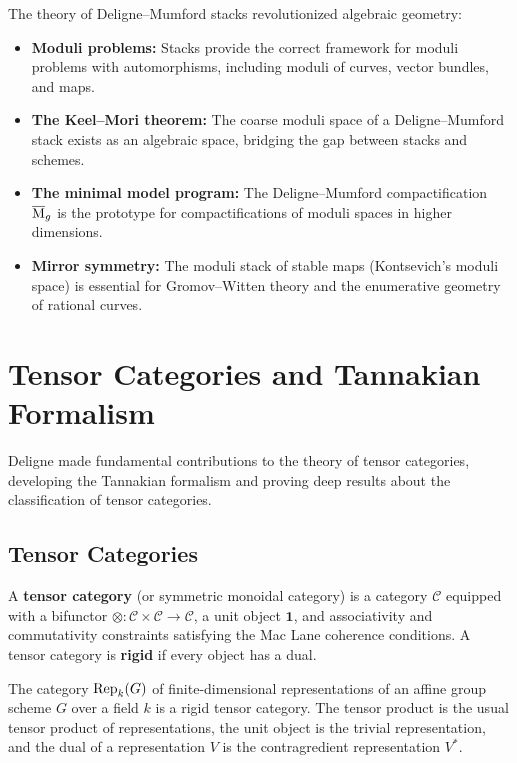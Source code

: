 The theory of Deligne--Mumford stacks revolutionized algebraic geometry:
\begin{itemize}
    \item \textbf{Moduli problems:} Stacks provide the correct framework for moduli problems with automorphisms, including moduli of curves, vector bundles, and maps.
    \item \textbf{The Keel--Mori theorem:} The coarse moduli space of a Deligne--Mumford stack exists as an algebraic space, bridging the gap between stacks and schemes.
    \item \textbf{The minimal model program:} The Deligne--Mumford compactification \(\overline{\operatorname{M}}_g\) is the prototype for compactifications of moduli spaces in higher dimensions.
    \item \textbf{Mirror symmetry:} The moduli stack of stable maps (Kontsevich's moduli space) is essential for Gromov--Witten theory and the enumerative geometry of rational curves.
\end{itemize}

\section{Tensor Categories and Tannakian Formalism}

Deligne made fundamental contributions to the theory of tensor categories, developing the Tannakian formalism and proving deep results about the classification of tensor categories.

\subsection{Tensor Categories}

A \textbf{tensor category} (or symmetric monoidal category) is a category \(\mathcal{C}\) equipped with a bifunctor \(\otimes: \mathcal{C} \times \mathcal{C} \to \mathcal{C}\), a unit object \(\mathbf{1}\), and associativity and commutativity constraints satisfying the Mac Lane coherence conditions. A tensor category is \textbf{rigid} if every object has a dual.

\begin{example}
The category \(\operatorname{Rep}_k(G)\) of finite-dimensional representations of an affine group scheme \(G\) over a field \(k\) is a rigid tensor category. The tensor product is the usual tensor product of representations, the unit object is the trivial representation, and the dual of a representation \(V\) is the contragredient representation \(V^*\).
\end{example}

